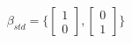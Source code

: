 \documentclass[preview]{standalone}
\begin{document}
\begin{align*}
\beta_{std} = \{ \begin{bmatrix} 1 \\ 0 \end{bmatrix}, \begin{bmatrix} 0 \\ 1 \end{bmatrix} \}
\end{align*}
\end{document}
